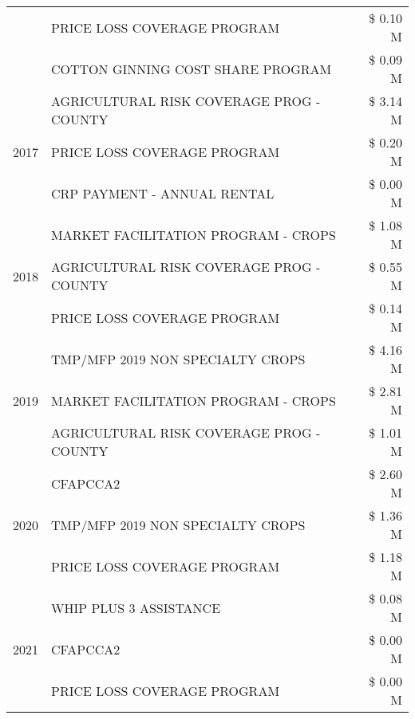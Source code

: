 \begin{tabular}{llr}
 & PRICE LOSS COVERAGE PROGRAM & \$ 0.10 M \\
 & COTTON GINNING COST SHARE PROGRAM & \$ 0.09 M \\
\cline{1-3}
\multirow[t]{3}{*}{2017} & AGRICULTURAL RISK COVERAGE PROG - COUNTY & \$ 3.14 M \\
 & PRICE LOSS COVERAGE PROGRAM & \$ 0.20 M \\
 & CRP PAYMENT - ANNUAL RENTAL & \$ 0.00 M \\
\cline{1-3}
\multirow[t]{3}{*}{2018} & MARKET FACILITATION PROGRAM - CROPS & \$ 1.08 M \\
 & AGRICULTURAL RISK COVERAGE PROG - COUNTY & \$ 0.55 M \\
 & PRICE LOSS COVERAGE PROGRAM & \$ 0.14 M \\
\cline{1-3}
\multirow[t]{3}{*}{2019} & TMP/MFP 2019 NON SPECIALTY CROPS & \$ 4.16 M \\
 & MARKET FACILITATION PROGRAM - CROPS & \$ 2.81 M \\
 & AGRICULTURAL RISK COVERAGE PROG - COUNTY & \$ 1.01 M \\
\cline{1-3}
\multirow[t]{3}{*}{2020} & CFAPCCA2 & \$ 2.60 M \\
 & TMP/MFP 2019 NON SPECIALTY CROPS & \$ 1.36 M \\
 & PRICE LOSS COVERAGE PROGRAM & \$ 1.18 M \\
\cline{1-3}
\multirow[t]{3}{*}{2021} & WHIP PLUS 3 ASSISTANCE & \$ 0.08 M \\
 & CFAPCCA2 & \$ 0.00 M \\
 & PRICE LOSS COVERAGE PROGRAM & \$ 0.00 M \\
\cline{1-3}
\bottomrule
\end{tabular}
